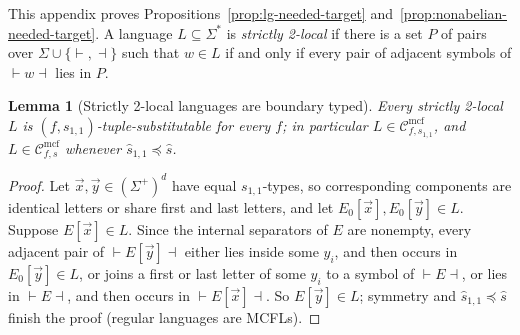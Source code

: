 \documentclass[11pt]{article}
\numberwithin{equation}{section}
\theoremstyle{plain}
\newtheorem{lemma}[theorem]{Lemma}
\theoremstyle{definition}
\theoremstyle{remark}
\newcommand{\Cmcf}[2]{\mathcal{C}^{\mathrm{mcf}}_{#1,#2}}
\newcommand{\tuple}[1]{\vec{#1}}
\theoremstyle{plain}
\begin{document}
This appendix proves Propositions~\ref{prop:lg-needed-target}
and~\ref{prop:nonabelian-needed-target}.  A language $L\subseteq\Sigma^*$ is
\emph{strictly 2-local} if there is a set $P$ of pairs over
$\Sigma\cup\{\vdash,\dashv\}$ such that $w\in L$ if and only if every pair of
adjacent symbols of $\vdash w\dashv$ lies in $P$.

\begin{lemma}[Strictly 2-local languages are boundary typed]
\label{lem:sl2-boundary-control}
Every strictly 2-local $L$ is $(f,s_{1,1})$-tuple-substitutable for every $f$; in
particular $L\in\Cmcf{f}{s_{1,1}}$, and $L\in\Cmcf{f}{s}$ whenever
$\widehat s_{1,1}\preceq\widehat s$.
\end{lemma}

\begin{proof}
Let $\tuple x,\tuple y\in(\Sigma^+)^d$ have equal $s_{1,1}$-types, so
corresponding components are identical letters or share first and last letters,
and let $E_0[\tuple x],E_0[\tuple y]\in L$.  Suppose $E[\tuple x]\in L$.  Since the
internal separators of $E$ are nonempty, every adjacent pair of
$\vdash E[\tuple y]\dashv$ either lies inside some $y_i$, and then occurs in
$E_0[\tuple y]\in L$, or joins a first or last letter of some $y_i$ to a symbol of
$\vdash E\dashv$, or lies in $\vdash E\dashv$, and then occurs in
$\vdash E[\tuple x]\dashv$.  So $E[\tuple y]\in L$; symmetry and
$\widehat s_{1,1}\preceq\widehat s$ finish the proof (regular languages are MCFLs).
\end{proof}
\end{document}
